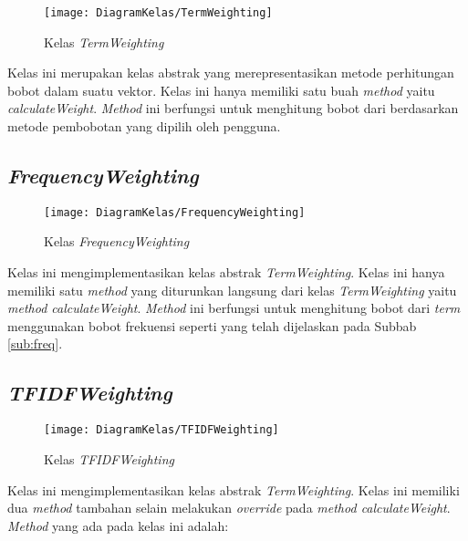 \begin{figure}[H]
	\begin{center}
		\texttt{[image: DiagramKelas/TermWeighting]}
		\caption{Kelas \textit{TermWeighting}}
		\label{fig:kelasTermWeighting}
	\end{center}
\end{figure}

Kelas ini merupakan kelas abstrak yang merepresentasikan metode perhitungan bobot dalam suatu vektor. Kelas ini hanya memiliki satu buah \textit{method} yaitu \textit{calculateWeight}. \textit{Method} ini berfungsi untuk menghitung bobot dari \term berdasarkan metode pembobotan yang dipilih oleh pengguna.

\subsection{\textit{FrequencyWeighting}}

\begin{figure}[H]
	\begin{center}
		\texttt{[image: DiagramKelas/FrequencyWeighting]}
		\caption{Kelas \textit{FrequencyWeighting}}
		\label{fig:kelasFrequencyWeighting}
	\end{center}
\end{figure}

Kelas ini mengimplementasikan kelas abstrak \textit{TermWeighting}. Kelas ini hanya memiliki satu \textit{method} yang diturunkan langsung dari kelas \textit{TermWeighting} yaitu \textit{method calculateWeight}. \textit{Method} ini berfungsi untuk menghitung bobot dari \textit{term} menggunakan bobot frekuensi seperti yang telah dijelaskan pada Subbab \ref{sub:freq}.

\subsection{\textit{TFIDFWeighting}}

\begin{figure}[H]
	\begin{center}
		\texttt{[image: DiagramKelas/TFIDFWeighting]}
		\caption{Kelas \textit{TFIDFWeighting}}
		\label{fig:kelasTFIDFWeighting}
	\end{center}
\end{figure}

Kelas ini mengimplementasikan kelas abstrak \textit{TermWeighting}. Kelas ini memiliki dua \textit{method} tambahan selain melakukan \textit{override} pada \textit{method calculateWeight}. \textit{Method} yang ada pada kelas ini adalah:

